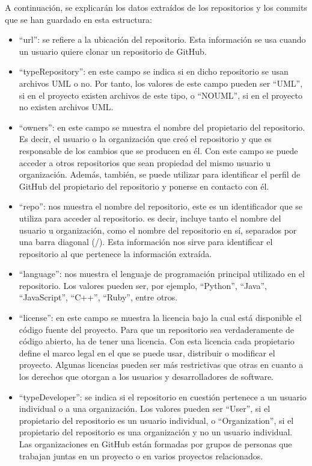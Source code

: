 \documentclass[a4paper, 12pt]{book}
\begin{document}
A continuación, se explicarán los datos extraídos de los repositorios y los commits que se han guardado en esta estructura:
\begin{itemize}
  \item ``url'': se refiere a la ubicación del repositorio.
  Esta información se usa cuando un usuario quiere clonar un repositorio de GitHub.

  \item ``typeRepository'': en este campo se indica si en dicho repositorio se usan archivos UML o no.
  Por tanto, los valores de este campo pueden ser ``UML'', si en el proyecto existen archivos de este tipo, o ``NOUML'', si en el proyecto no existen archivos UML.
  
  \item ``owners'': en este campo se muestra el nombre del propietario del repositorio. 
  Es decir, el usuario o la organización que creó el repositorio y que es responsable de los cambios que se producen en él. 
  Con este campo se puede acceder a otros repositorios que sean propiedad del mismo usuario u organización. 
  Además, también, se puede utilizar para identificar el perfil de GitHub del propietario del repositorio y ponerse en contacto con él.

  \item ``repo'': nos muestra el nombre del repositorio, este es un identificador que se utiliza para acceder al repositorio.  es decir, incluye tanto el nombre del usuario u organización, como el nombre del repositorio en sí, separados por una barra diagonal (/).
  Esta información nos sirve para identificar el repositorio al que pertenece la información extraída.

  \item ``language'': nos muestra el lenguaje de programación principal utilizado en el repositorio.
  Los valores pueden ser, por ejemplo, ``Python'', ``Java'', ``JavaScript'', ``C++'', ``Ruby'', entre otros.
  
  \item ``license'': en este campo se muestra la licencia bajo la cual está disponible el código fuente del proyecto.
  Para que un repositorio sea verdaderamente de código abierto, ha de tener una licencia. 
  Con esta licencia cada propietario define el marco legal en el que se puede usar, distribuir o modificar el proyecto.
  Algunas licencias pueden ser más restrictivas que otras en cuanto a los derechos que otorgan a los usuarios y desarrolladores de software.
  
  \item ``typeDeveloper'': se indica si el repositorio en cuestión pertenece a un usuario individual o a una organización. 
  Los valores pueden ser ``User'', si el propietario del repositorio es un usuario individual, o ``Organization'', si el propietario del repositorio es una organización y no un usuario individual. 
  Las organizaciones en GitHub están formadas por grupos de personas que trabajan juntas en un proyecto o en varios proyectos relacionados.
  

\end{itemize}
\end{document}
